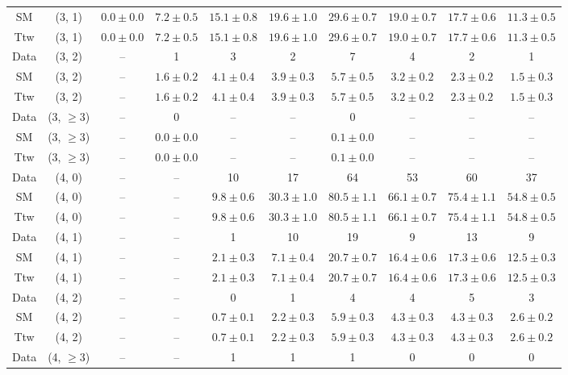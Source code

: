 \begin{table}[h!]
{\begin{tabular}{cccccccccc}
	SM & (3, 1) & $0.0\pm 0.0$ & $7.2\pm 0.5$ & $15.1\pm 0.8$ & $19.6\pm 1.0$ & $29.6\pm 0.7$ & $19.0\pm 0.7$ & $17.7\pm 0.6$ & $11.3\pm 0.5$ \\[0.5ex] 
	Ttw & (3, 1) & $0.0\pm 0.0$ & $7.2\pm 0.5$ & $15.1\pm 0.8$ & $19.6\pm 1.0$ & $29.6\pm 0.7$ & $19.0\pm 0.7$ & $17.7\pm 0.6$ & $11.3\pm 0.5$ \\[0.5ex] 
	Data & (3, 2) & -- & 1 & 3 & 2 & 7 & 4 & 2 & 1 \\[0.5ex] 
	SM & (3, 2) & -- & $1.6\pm 0.2$ & $4.1\pm 0.4$ & $3.9\pm 0.3$ & $5.7\pm 0.5$ & $3.2\pm 0.2$ & $2.3\pm 0.2$ & $1.5\pm 0.3$ \\[0.5ex] 
	Ttw & (3, 2) & -- & $1.6\pm 0.2$ & $4.1\pm 0.4$ & $3.9\pm 0.3$ & $5.7\pm 0.5$ & $3.2\pm 0.2$ & $2.3\pm 0.2$ & $1.5\pm 0.3$ \\[0.5ex] 
	Data & (3, $\ge3$) & -- & 0 & -- & -- & 0 & -- & -- & -- \\[0.5ex] 
	SM & (3, $\ge3$) & -- & $0.0\pm 0.0$ & -- & -- & $0.1\pm 0.0$ & -- & -- & -- \\[0.5ex] 
	Ttw & (3, $\ge3$) & -- & $0.0\pm 0.0$ & -- & -- & $0.1\pm 0.0$ & -- & -- & -- \\[0.5ex] 
	Data & (4, 0) & -- & -- & 10 & 17 & 64 & 53 & 60 & 37 \\[0.5ex] 
	SM & (4, 0) & -- & -- & $9.8\pm 0.6$ & $30.3\pm 1.0$ & $80.5\pm 1.1$ & $66.1\pm 0.7$ & $75.4\pm 1.1$ & $54.8\pm 0.5$ \\[0.5ex] 
	Ttw & (4, 0) & -- & -- & $9.8\pm 0.6$ & $30.3\pm 1.0$ & $80.5\pm 1.1$ & $66.1\pm 0.7$ & $75.4\pm 1.1$ & $54.8\pm 0.5$ \\[0.5ex] 
	Data & (4, 1) & -- & -- & 1 & 10 & 19 & 9 & 13 & 9 \\[0.5ex] 
	SM & (4, 1) & -- & -- & $2.1\pm 0.3$ & $7.1\pm 0.4$ & $20.7\pm 0.7$ & $16.4\pm 0.6$ & $17.3\pm 0.6$ & $12.5\pm 0.3$ \\[0.5ex] 
	Ttw & (4, 1) & -- & -- & $2.1\pm 0.3$ & $7.1\pm 0.4$ & $20.7\pm 0.7$ & $16.4\pm 0.6$ & $17.3\pm 0.6$ & $12.5\pm 0.3$ \\[0.5ex] 
	Data & (4, 2) & -- & -- & 0 & 1 & 4 & 4 & 5 & 3 \\[0.5ex] 
	SM & (4, 2) & -- & -- & $0.7\pm 0.1$ & $2.2\pm 0.3$ & $5.9\pm 0.3$ & $4.3\pm 0.3$ & $4.3\pm 0.3$ & $2.6\pm 0.2$ \\[0.5ex] 
	Ttw & (4, 2) & -- & -- & $0.7\pm 0.1$ & $2.2\pm 0.3$ & $5.9\pm 0.3$ & $4.3\pm 0.3$ & $4.3\pm 0.3$ & $2.6\pm 0.2$ \\[0.5ex] 
	Data & (4, $\ge3$) & -- & -- & 1 & 1 & 1 & 0 & 0 & 0 \\[0.5ex] 

\end{tabular}}
\end{table}
